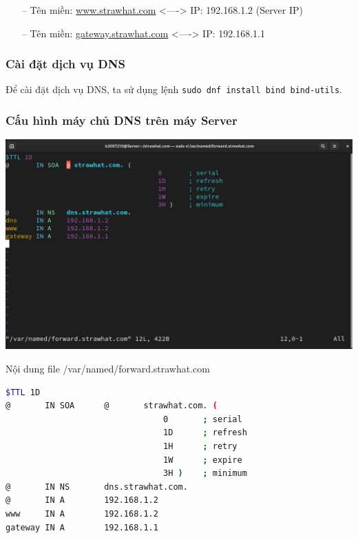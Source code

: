 \documentclass[a4paper, 11pt]{article}
\begin{document}
\begin{itemize}
    \item[--] Tên miền: \url{www.strawhat.com} <----> IP: 192.168.1.2 (Server IP)
    \item[--] Tên miền: \url{gateway.strawhat.com} <----> IP: 192.168.1.1
\end{itemize}

\subsubsection{Cài đặt dịch vụ DNS}

Để cài đặt dịch vụ DNS, ta sử dụng lệnh \texttt{sudo dnf install bind bind-utils}.

\subsubsection{Cấu hình máy chủ DNS trên máy Server}

\begin{minipage}
    {\linewidth}
    \captionsetup{type=figure}
    \centering
    \includegraphics[width=\linewidth]{images/forward-strawhat-com.png}
    \caption{Nội dung file /var/named/forward.strawhat.com}
    \label{figure:forward-strawhat-com}
\end{minipage}

\begin{lstlisting}[language=bash, caption={Nội dung file /var/named/forward.strawhat.com}]
$TTL 1D
@       IN SOA      @       strawhat.com. (
                                0       ; serial
                                1D      ; refresh
                                1H      ; retry
                                1W      ; expire
                                3H )    ; minimum
@       IN NS       dns.strawhat.com.
@       IN A        192.168.1.2
www     IN A        192.168.1.2
gateway IN A        192.168.1.1
\end{lstlisting}
\end{document}
